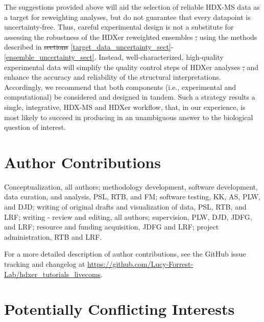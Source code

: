 \documentclass[9pt,tutorial]{livecoms}
\newcommand{\githubrepository}{\url{https://github.com/Lucy-Forrest-Lab/hdxer_tutorials_livecoms}} %
\providecommand{\DIFadd}[1]{{\protect\color{blue}\uwave{#1}}} %
\providecommand{\DIFdel}[1]{{\protect\color{red}\sout{#1}}}                      %
\providecommand{\DIFaddbegin}{} %
\providecommand{\DIFaddend}{} %
\providecommand{\DIFdelbegin}{} %
\providecommand{\DIFdelend}{} %
\begin{document}
The suggestions provided above will aid the selection of reliable HDX-MS data as a target for reweighting analyses, but do not guarantee that every datapoint is uncertainty-free.
Thus, careful experimental design is not a substitute for assessing the robustness of the HDXer reweighted ensembles \DIFdelbegin \DIFdel{, }\DIFdelend using the methods described in \DIFdelbegin \DIFdel{sections }\DIFdelend \DIFaddbegin \DIFadd{Sections }\DIFaddend \ref{target_data_uncertainty_sect}-\ref{ensemble_uncertainty_sect}.
Instead, well-characterized, high-quality experimental data will simplify the quality control steps of HDXer analyses \DIFdelbegin \DIFdel{, }\DIFdelend and enhance the accuracy and reliability of the structural interpretations.
Accordingly, we recommend that both components (i.e., experimental and computational) be considered and designed in tandem.
Such a strategy results \DIFaddbegin \DIFadd{in }\DIFaddend a single, integrative, HDX-MS and HDXer workflow, that, in our experience, is most likely to succeed in producing in an unambiguous answer to the biological question of interest.


\section{Author Contributions}

Conceptualization, all authors; methodology development, software development, data curation, and analysis, PSL, RTB, and FM; software testing, KK, AS, PLW, and DJD; writing of original drafts and visualization of data, PSL, RTB, and LRF; writing - review and editing, all authors; supervision, PLW, DJD, JDFG, and LRF; resource and funding acquisition, JDFG and LRF; project administration, RTB and LRF.

For a more detailed description of author contributions,
see the GitHub issue tracking and changelog at \githubrepository.

\section{Potentially Conflicting Interests}
\end{document}
